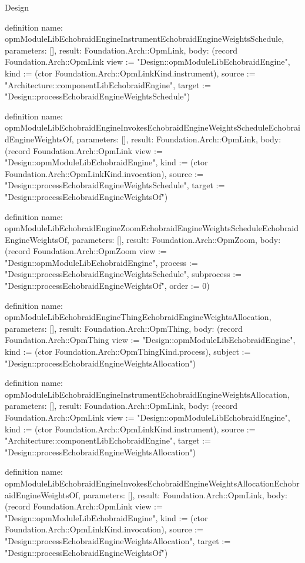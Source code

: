 \begin{lexlean}{Design}
\begin{semanticmodule}
definition{
  name: opmModuleLibEchobraidEngineInstrumentEchobraidEngineWeightsSchedule,
  parameters: [],
  result: Foundation.Arch::OpmLink,
  body: (record Foundation.Arch::OpmLink {view := "Design::opmModuleLibEchobraidEngine", kind := (ctor Foundation.Arch::OpmLinkKind.instrument), source := "Architecture::componentLibEchobraidEngine", target := "Design::processEchobraidEngineWeightsSchedule"})
}

definition{
  name: opmModuleLibEchobraidEngineInvokesEchobraidEngineWeightsScheduleEchobraidEngineWeightsOf,
  parameters: [],
  result: Foundation.Arch::OpmLink,
  body: (record Foundation.Arch::OpmLink {view := "Design::opmModuleLibEchobraidEngine", kind := (ctor Foundation.Arch::OpmLinkKind.invocation), source := "Design::processEchobraidEngineWeightsSchedule", target := "Design::processEchobraidEngineWeightsOf"})
}

definition{
  name: opmModuleLibEchobraidEngineZoomEchobraidEngineWeightsScheduleEchobraidEngineWeightsOf,
  parameters: [],
  result: Foundation.Arch::OpmZoom,
  body: (record Foundation.Arch::OpmZoom {view := "Design::opmModuleLibEchobraidEngine", process := "Design::processEchobraidEngineWeightsSchedule", subprocess := "Design::processEchobraidEngineWeightsOf", order := 0})
}

definition{
  name: opmModuleLibEchobraidEngineThingEchobraidEngineWeightsAllocation,
  parameters: [],
  result: Foundation.Arch::OpmThing,
  body: (record Foundation.Arch::OpmThing {view := "Design::opmModuleLibEchobraidEngine", kind := (ctor Foundation.Arch::OpmThingKind.process), subject := "Design::processEchobraidEngineWeightsAllocation"})
}

definition{
  name: opmModuleLibEchobraidEngineInstrumentEchobraidEngineWeightsAllocation,
  parameters: [],
  result: Foundation.Arch::OpmLink,
  body: (record Foundation.Arch::OpmLink {view := "Design::opmModuleLibEchobraidEngine", kind := (ctor Foundation.Arch::OpmLinkKind.instrument), source := "Architecture::componentLibEchobraidEngine", target := "Design::processEchobraidEngineWeightsAllocation"})
}

definition{
  name: opmModuleLibEchobraidEngineInvokesEchobraidEngineWeightsAllocationEchobraidEngineWeightsOf,
  parameters: [],
  result: Foundation.Arch::OpmLink,
  body: (record Foundation.Arch::OpmLink {view := "Design::opmModuleLibEchobraidEngine", kind := (ctor Foundation.Arch::OpmLinkKind.invocation), source := "Design::processEchobraidEngineWeightsAllocation", target := "Design::processEchobraidEngineWeightsOf"})
}


\end{semanticmodule}
\end{lexlean}
